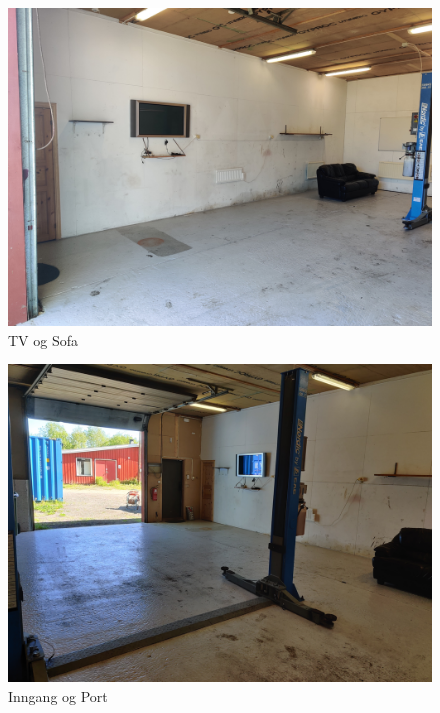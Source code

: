         \begin{figure}[H]
            \centering
            \includegraphics[width=1\textwidth]{Img/TV_Og_Sofa.JPG}
            \caption{TV og Sofa}
            \label{fig:TV_Og_Sofa}
        \end{figure}


        \begin{figure}[H]
            \centering
            \includegraphics[width=1\textwidth]{Img/Inngang.jpg}
            \caption{Inngang og Port}
            \label{fig:Inngang}
        \end{figure}



